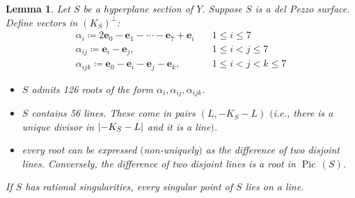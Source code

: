 \documentclass[11pt]{amsart}
\newtheorem{lemma}[thm]{Lemma}
\theoremstyle{definition}
\newcommand{\pr}[1]{\mathbb P^{#1}}
\DeclareMathOperator{\Pic}{Pic\,}
\DeclarePairedDelimiter{\abs}{\lvert}{\rvert}
\begin{document}
\begin{lemma}\label{lem_hyp_sec_d=2}
Let $S$ be a hyperplane section of $Y$.
Suppose $S$ is a del Pezzo surface. Define vectors in $(K_S)^\perp$:
\begin{align*}
   \alpha_i\coloneqq 2\mathbf{e}_0-\mathbf{e}_1-\cdots-\mathbf{e}_7+\mathbf{e}_i &\quad 1\leq i \leq 7\\
   \alpha_{ij}\coloneqq \mathbf{e}_i-\mathbf{e}_j, &\quad 1\leq i<j \leq 7\\
   \alpha_{ijk} \coloneqq \mathbf{e}_0-\mathbf{e}_i-\mathbf{e}_j-\mathbf{e}_k, &\quad 1\leq i<j<k \leq 7
\end{align*}
\begin{itemize}
    \item $S$ admits 126 roots of the form $\alpha_i,\alpha_{ij},\alpha_{ijk}$. 
    \item $S$ contains 56 lines. These come in pairs $(L,-K_S-L)$ $($\textit{i.e.}, there is a unique divisor in $\abs{-K_S-L}$ and it is a line$)$.
    \item every root can be expressed $($non-uniquely$)$ as the difference of two disjoint lines. Conversely, the difference of two disjoint lines is a root in $\Pic(S)$.
\end{itemize}
If $S$ has rational singularities,
 every singular point of $S$ lies on a line. 
\end{lemma}
\end{document}

